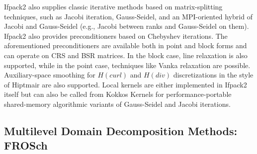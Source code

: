 Ifpack2 also supplies classic iterative methods based on matrix-splitting techniques, such as Jacobi iteration, Gauss-Seidel, and an MPI-oriented hybrid of Jacobi and Gauss-Seidel (e.g., Jacobi between ranks and Gauss-Seidel on them). Ifpack2 also provides preconditioners
based on Chebyshev iterations. The aforementioned preconditioners are available both in point and block
forms and can operate on CRS and BSR matrices. In the block case,
line relaxation is also supported, while in the point case, techniques
like Vanka relaxation \cite{Vanka1986} are possible.  Auxiliary-space
smoothing for $H(curl)$ and $H(div)$ discretizations in the style of
Hiptmair \cite{Hiptmair1997} are also supported.
Local kernels are either implemented in Ifpack2 itself
but can also be called from Kokkos Kernels for performance\hyp{}portable shared-memory algorithmic variants of Gauss-Seidel and Jacobi iterations.

\subsection{Multilevel Domain Decomposition Methods: FROSch}
\label{ssec:frosch}

